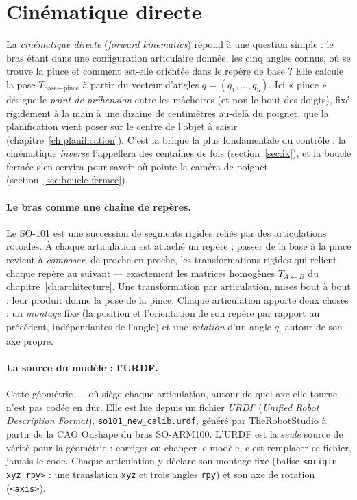 \section{Cinématique directe}
\label{sec:fk}

La \emph{cinématique directe} (\emph{forward kinematics}) répond à une question simple : le bras étant dans une configuration articulaire donnée, les cinq angles connus, où se trouve la pince et comment est-elle orientée dans le repère de base ? Elle calcule la pose $T_{\text{base}\leftarrow\text{pince}}$ à partir du vecteur d'angles $q = (q_1, \dots, q_5)$. Ici « pince » désigne le \emph{point de préhension} entre les mâchoires (et non le bout des doigts), fixé rigidement à la main à une dizaine de centimètres au-delà du poignet, que la planification vient poser sur le centre de l'objet à saisir (chapitre~\ref{ch:planification}). C'est la brique la plus fondamentale du contrôle : la cinématique \emph{inverse} l'appellera des centaines de fois (section~\ref{sec:ik}), et la boucle fermée s'en servira pour savoir où pointe la caméra de poignet (section~\ref{sec:boucle-fermee}).

\paragraph{Le bras comme une chaîne de repères.} Le SO-101 est une succession de segments rigides reliés par des articulations rotoïdes. À chaque articulation est attaché un repère ; passer de la base à la pince revient à \emph{composer}, de proche en proche, les transformations rigides qui relient chaque repère au suivant --- exactement les matrices homogènes $T_{A\leftarrow B}$ du chapitre~\ref{ch:architecture}. Une transformation par articulation, mises bout à bout : leur produit donne la pose de la pince. Chaque articulation apporte deux choses : un \emph{montage} fixe (la position et l'orientation de son repère par rapport au précédent, indépendantes de l'angle) et une \emph{rotation} d'un angle $q_i$ autour de son axe propre.

\paragraph{La source du modèle : l'URDF.} Cette géométrie --- où siège chaque articulation, autour de quel axe elle tourne --- n'est pas codée en dur. Elle est lue depuis un fichier \emph{URDF} (\emph{Unified Robot Description Format}), \texttt{so101\_new\_calib.urdf}, généré par TheRobotStudio à partir de la CAO Onshape du bras SO-ARM100. L'URDF est la \emph{seule} source de vérité pour la géométrie : corriger ou changer le modèle, c'est remplacer ce fichier, jamais le code. Chaque articulation y déclare son montage fixe (balise \texttt{<origin xyz rpy>} : une translation \texttt{xyz} et trois angles \texttt{rpy}) et son axe de rotation (\texttt{<axis>}).

